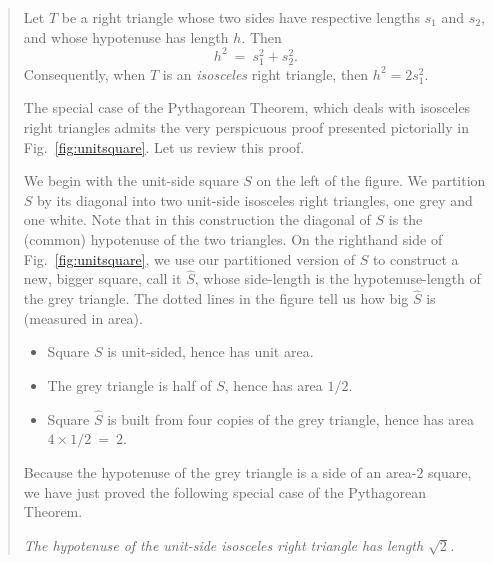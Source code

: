 \begin{quote}
\begin{theorem}
\label{thm:Pythagorean-thm}
Let $T$ be a right triangle whose two sides have respective lengths
$s_1$ and $s_2$, and whose hypotenuse has length $h$.  Then
\[ h^2 \ = \ s_1^2 + s_2^2. \]
Consequently, when $T$ is an {\em isosceles} right triangle, then $h^2
= 2 s_1^2$.
\end{theorem}


The special case of the Pythagorean Theorem, which deals with
isosceles right triangles admits the very perspicuous proof presented
pictorially in Fig.~\ref{fig:unitsquare}.  Let us review this proof.

We begin with the unit-side square $S$ on the left of the figure.  We
partition $S$ by its diagonal into two unit-side isosceles right
triangles, one grey and one white.  Note that in this construction the
diagonal of $S$ is the (common) hypotenuse of the two triangles.  On
the righthand side of Fig.~\ref{fig:unitsquare}, we use our
partitioned version of $S$ to construct a new, bigger square, call it
$\widehat{S}$, whose side-length is the hypotenuse-length of the grey
triangle.  The dotted lines in the figure tell us how big
$\widehat{S}$ is (measured in area).
\begin{itemize}
\item
Square $S$ is unit-sided, hence has unit area.
\item
The grey triangle is half of $S$, hence has area $1/2$.
\item
Square $\widehat{S}$ is built from four copies of the grey
triangle, hence has area $4 \times 1/2 \ = \ 2$.
\end{itemize}
Because the hypotenuse of the grey triangle is a side of an area-$2$
square, we have just proved the following special case of the
Pythagorean Theorem.

{\em The hypotenuse of the unit-side isosceles right triangle has
  length $\sqrt{2}$.}
\end{quote}

